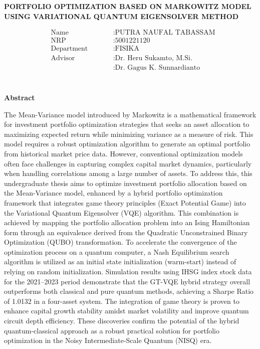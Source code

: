 \begin{center}
	\large{\textbf{PORTFOLIO OPTIMIZATION BASED ON MARKOWITZ MODEL USING VARIATIONAL QUANTUM EIGENSOLVER METHOD}}
\end{center}
\begin{minipage}{5cm}
\begin{align*}
&\text{Name} \qquad &&: \text{PUTRA NAUFAL TABASSAM} \\
&\text{NRP} \qquad &&: \text{5001221120} \\
&\text{Department} \qquad &&: \text{FISIKA} \\
&\text{Advisor}\qquad &&: \text{Dr. Heru Sukamto, M.Si.}\\
& \qquad &&: \text{Dr. Gagus K. Sunnardianto} \\
\end{align*}
\end{minipage} \\
\textbf{Abstract}
\par The Mean-Variance model introduced by Markowitz is a mathematical framework for investment portfolio optimization strategies that seeks an asset allocation to maximizing expected return while minimizing variance as a measure of risk. This model requires a robust optimization algorithm to generate an optimal portfolio from historical market price data. However, conventional optimization models often face challenges in capturing complex capital market dynamics, particularly when handling correlations among a large number of assets. To address this, this undergraduate thesis aims to optimize investment portfolio allocation based on the Mean-Variance model, enhanced by a hybrid portfolio optimization framework that integrates game theory principles (Exact Potential Game) into the Variational Quantum Eigensolver (VQE) algorithm. This combination is achieved by mapping the portfolio allocation problem into an Ising Hamiltonian form through an equivalence derived from the Quadratic Unconstrained Binary Optimization (QUBO) transformation. To accelerate the convergence of the optimization process on a quantum computer, a Nash Equilibrium search algorithm is utilized as an initial state initialization (warm-start) instead of relying on random initialization. Simulation results using IHSG index stock data for the 2021--2023 period demonstrate that the GT-VQE hybrid strategy overall outperforms both classical and pure quantum methods, achieving a Sharpe Ratio of 1.0132 in a four-asset system. The integration of game theory is proven to enhance capital growth stability amidst market volatility and improve quantum circuit depth efficiency. These discoveries confirm the potential of the hybrid quantum-classical approach as a robust practical solution for portfolio optimization in the Noisy Intermediate-Scale Quantum (NISQ) era.

